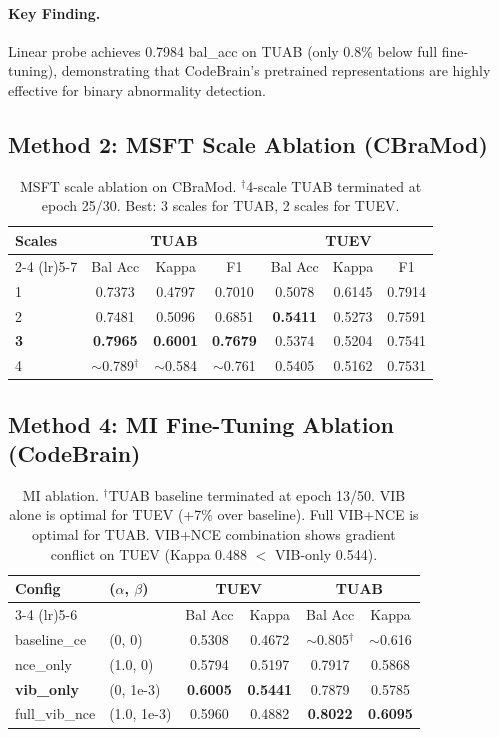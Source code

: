 \documentclass{article}
\begin{document}
\paragraph{Key Finding.} Linear probe achieves 0.7984 bal\_acc on TUAB (only 0.8\% below full fine-tuning), demonstrating that CodeBrain's pretrained representations are highly effective for binary abnormality detection.

\subsection{Method 2: MSFT Scale Ablation (CBraMod)}

\begin{table}[h]
\centering
\small
\begin{tabular}{@{}lcccccc@{}}
\toprule
Scales & \multicolumn{3}{c}{TUAB} & \multicolumn{3}{c}{TUEV} \\
\cmidrule(lr){2-4} \cmidrule(lr){5-7}
& Bal Acc & Kappa & F1 & Bal Acc & Kappa & F1 \\
\midrule
1 & 0.7373 & 0.4797 & 0.7010 & 0.5078 & 0.6145 & 0.7914 \\
2 & 0.7481 & 0.5096 & 0.6851 & \textbf{0.5411} & 0.5273 & 0.7591 \\
\textbf{3} & \textbf{0.7965} & \textbf{0.6001} & \textbf{0.7679} & 0.5374 & 0.5204 & 0.7541 \\
4 & $\sim$0.789$^\dagger$ & $\sim$0.584 & $\sim$0.761 & 0.5405 & 0.5162 & 0.7531 \\
\bottomrule
\end{tabular}
\caption{MSFT scale ablation on CBraMod. $^\dagger$4-scale TUAB terminated at epoch 25/30. Best: 3 scales for TUAB, 2 scales for TUEV.}
\end{table}

\subsection{Method 4: MI Fine-Tuning Ablation (CodeBrain)}

\begin{table}[h]
\centering
\small
\begin{tabular}{@{}llcccc@{}}
\toprule
Config & ($\alpha$, $\beta$) & \multicolumn{2}{c}{TUEV} & \multicolumn{2}{c}{TUAB} \\
\cmidrule(lr){3-4} \cmidrule(lr){5-6}
& & Bal Acc & Kappa & Bal Acc & Kappa \\
\midrule
baseline\_ce & (0, 0) & 0.5308 & 0.4672 & $\sim$0.805$^\dagger$ & $\sim$0.616 \\
nce\_only & (1.0, 0) & 0.5794 & 0.5197 & 0.7917 & 0.5868 \\
\textbf{vib\_only} & (0, 1e-3) & \textbf{0.6005} & \textbf{0.5441} & 0.7879 & 0.5785 \\
full\_vib\_nce & (1.0, 1e-3) & 0.5960 & 0.4882 & \textbf{0.8022} & \textbf{0.6095} \\
\bottomrule
\end{tabular}
\caption{MI ablation. $^\dagger$TUAB baseline terminated at epoch 13/50. VIB alone is optimal for TUEV (+7\% over baseline). Full VIB+NCE is optimal for TUAB. VIB+NCE combination shows gradient conflict on TUEV (Kappa 0.488 $<$ VIB-only 0.544).}
\end{table}
\end{document}
